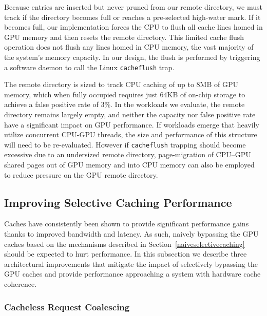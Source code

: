 Because entries are inserted but never pruned from our remote directory, we must track if the directory
becomes full or reaches a pre-selected high-water mark.  If it becomes full, our implementation
forces the CPU to flush all cache lines homed in GPU memory and then resets the remote directory.  This limited
cache flush operation  does not flush any lines
homed in CPU memory, the vast majority of the system's memory capacity.  In our
design, the flush is performed by triggering a software daemon to call the Linux \texttt{cacheflush} trap.  

The remote directory is sized to track CPU caching of up to 8MB of GPU memory, which when fully occupied
requires just 64KB of on-chip storage to achieve a false positive rate of 3\%.  In the workloads we evaluate,
the remote directory remains largely empty, and neither the capacity nor false positive rate have a significant
impact on GPU performance.
If workloads emerge that 
heavily utilize concurrent CPU-GPU threads, the size and performance of this structure will need to be re-evaluated. 
However if \texttt{cacheflush} trapping should become excessive due to an undersized remote directory,
page-migration of CPU--GPU shared pages out of GPU memory and into CPU memory can also be employed to 
reduce pressure on the GPU remote directory.

\subsection{Improving Selective Caching Performance}
\label{microarchimprovements}

Caches have consistently been shown to provide significant performance 
gains thanks to improved bandwidth and latency.  As such, naively bypassing the GPU caches based on the mechanisms described in 
Section~\ref{naiveselectivecaching} should be expected to hurt performance. In this subsection we describe 
three architectural improvements that mitigate the impact of selectively bypassing the GPU caches and provide performance approaching
a system with hardware cache coherence.

\subsubsection{Cacheless Request Coalescing}
\label{coalescing}

